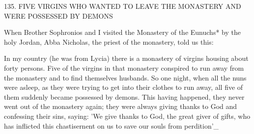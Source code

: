 135. FIVE VIRGINS WHO WANTED TO LEAVE
THE MONASTERY AND WERE POSSESSED
BY DEMONS

When Brother Sophronios and I visited the Monastery of the
Eunuchs* by the holy Jordan, Abba Nicholas, the priest of the
monastery, told us this:

In my country (he was from Lycia) there is a monastery of virgins
housing about forty persons. Five of the virgins in that monastery
conspired to run away from the monastery and to find themselves
husbands. So one night, when all the nuns were asleep, as they were
trying to get into their clothes to run away, all five of them
suddenly became possessed by demons. This having happened, they
never went out of the monastery again; they were always giving
thanks to God and confessing their sins, saying: 'We give thanks to
God, the great giver of gifts, who has inflicted this chastisernent on
us to save our souls from perdition'\_

